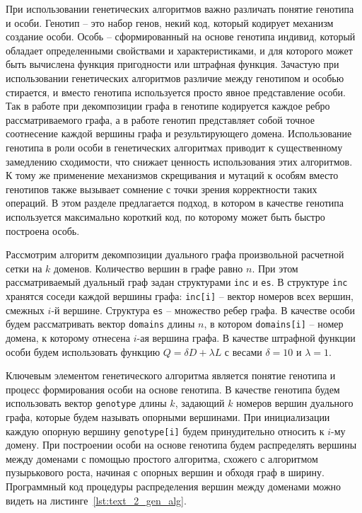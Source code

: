 При использовании генетических алгоритмов важно различать понятие генотипа и особи.
Генотип -- это набор генов, некий код, который кодирует механизм создание особи.
Особь -- сформированный на основе генотипа индивид, который обладает определенными свойствами и характеристиками, и для которого может быть вычислена функция пригодности или штрафная функция.
Зачастую при использовании генетических алгоритмов различие между генотипом и особью стирается, и вместо генотипа используется просто явное представление особи.
Так в работе \cite{Chaouche2023Graph} при декомпозиции графа в генотипе кодируется каждое ребро рассматриваемого графа, а в работе \cite{Li2020Graph} генотип представляет собой точное соотнесение каждой вершины графа и результирующего домена.
Использование генотипа в роли особи в генетических алгоритмах приводит к существенному замедлению сходимости, что снижает ценность использования этих алгоритмов.
К тому же применение механизмов скрещивания и мутаций к особям вместо генотипов также вызывает сомнение с точки зрения корректности таких операций.
В этом разделе предлагается подход, в котором в качестве генотипа используется максимально короткий код, по которому может быть быстро построена особь.

Рассмотрим алгоритм декомпозиции дуального графа произвольной расчетной сетки на $k$ доменов.
Количество вершин в графе равно $n$.
При этом рассматриваемый дуальный граф задан структурами \texttt{inc} и \texttt{es}.
В структуре \texttt{inc} хранятся соседи каждой вершины графа: \texttt{inc[i]} -- вектор номеров всех вершин, смежных $i$-й вершине.
Структура \texttt{es} -- множество ребер графа.
В качестве особи будем рассматривать вектор \texttt{domains} длины $n$, в котором \texttt{domains[i]} -- номер домена, к которому отнесена $i$-ая вершина графа.
В качестве штрафной функции особи будем использовать функцию $Q = \delta D + \lambda L$ с весами $\delta = 10$ и $\lambda = 1$.

Ключевым элементом генетического алгоритма является понятие генотипа и процесс формирования особи на основе генотипа.
В качестве генотипа будем использовать вектор \texttt{genotype} длины $k$, задающий $k$ номеров вершин дуального графа, которые будем называть опорными вершинами.
При инициализации каждую опорную вершину \texttt{genotype[i]} будем принудительно относить к $i$-му домену.
При построении особи на основе генотипа будем распределять вершины между доменами с помощью простого алгоритма, схожего с алгоритмом пузырькового роста, начиная с опорных вершин и обходя граф в ширину.
Программный код процедуры распределения вершин между доменами можно видеть на листинге~\ref{lst:text_2_gen_alg}.

